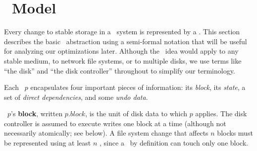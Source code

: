 
\section{\Patch\ Model}
\label{sec:patch}

\makeatletter
\let\emptyset\varnothing
\newcommand{\PBlock}[1]{\ensuremath{#1.\textit{block}}}
\newcommand{\PSetlim}[1]{\def\@next{#1}\ifx\@next\@empty\else[\@next]\fi}
\newcommand{\PMem}[1][]{\ensuremath{\mathcal{U}\PSetlim{#1}}}
\newcommand{\PInf}[1][]{\ensuremath{\mathcal{F}\PSetlim{#1}}}
\newcommand{\PDisk}[1][]{\ensuremath{\mathcal{C}\PSetlim{#1}}}
\newcommand{\PHard}[1][]{\ensuremath{\textit{\Nrb}\PSetlim{#1}}}
\newcommand{\PSoft}[1][]{\ensuremath{\textit{\Rb}\PSetlim{#1}}}
\newcommand{\PEmpty}[1][]{\ensuremath{\textit{\Noop}\PSetlim{#1}}}
\newcommand{\PDDepset}[1]{\ensuremath{\def\@next{#1}\ifx\@next\@empty\else\@next.\fi\textit{ddeps}}}
\newcommand{\PDepend}{\ensuremath{\leadsto}}
\newcommand{\PDDepend}{\ensuremath{\rightarrow}}
\newcommand{\PDepset}[1]{\ensuremath{\textit{Dep}[#1]}}
\newcommand{\PRDepset}[1]{\ensuremath{\textit{RDep}[#1]}}
\makeatother

Every change to stable storage in a \Kudos\ system is represented by a
\emph{\patch}.
%
This section describes the basic \patch\ abstraction using a semi-formal
notation that will be useful for analyzing our optimizations later.
%
Although the \patch\ idea would apply to any stable medium, to network file
systems, or to multiple disks, we use terms like ``the disk'' and ``the
disk controller'' throughout to simplify our terminology.


Each \patch\ $p$ encapsulates four important pieces of information: its
 \emph{block}, its \emph{state}, a set of \emph{direct dependencies}, and
 some \emph{undo data}.

\Patch\ $p$'s \textbf{block}, written $\PBlock{p}$, is the unit of disk data
 to which $p$ applies.  The disk controller is assumed to execute writes one
 block at a time (although not necessarily atomically; see below).  A file system
 change that affects $n$ blocks must be represented using at least $n$
 \patches, since a \patch\ by definition can touch only one block.

